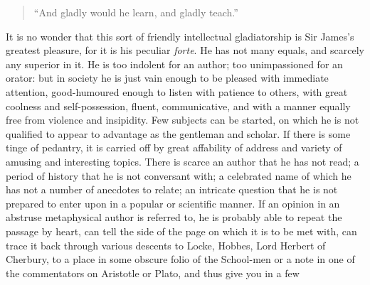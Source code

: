 \begin{quote}
  ``And gladly would he learn, and gladly teach.''

\end{quote}
It is no wonder that this sort of friendly intellectual
gladiatorship is Sir James's greatest pleasure, for it is his
peculiar \emph{forte}. He has not many equals, and scarcely any
superior in it. He is too indolent for an author; too
unimpassioned for an orator: but in society he is just vain enough
to be pleased with immediate attention, good-humoured enough to
listen with patience to others, with great coolness and
self-possession, fluent, communicative, and with a manner equally
free from violence and insipidity. Few subjects can be started, on
which he is not qualified to appear to advantage as the gentleman
and scholar. If there is some tinge of pedantry, it is carried off
by great affability of address and variety of amusing and
interesting topics. There is scarce an author that he has not
read; a period of history that he is not conversant with; a
celebrated name of which he has not a number of anecdotes to
relate; an intricate question that he is not prepared to enter
upon in a popular or scientific manner. If an opinion in an
abstruse metaphysical author is referred to, he is probably able
to repeat the passage by heart, can tell the side of the page on
which it is to be met with, can trace it back through various
descents to Locke, Hobbes, Lord Herbert of Cherbury, to a place in
some obscure folio of the School-men or a note in one of the
commentators on Aristotle or Plato, and thus give you in a few
